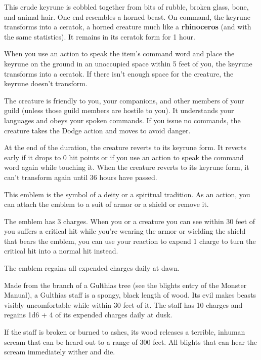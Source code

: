 \documentclass[10pt,a4paper,twoside,bg=print,twocolumn,openany,nodeprecatedcode]{dndbook}
\begin{document}
This crude keyrune is cobbled together from bits of rubble, broken glass, bone, and animal hair. One end resembles a horned beast. On command, the keyrune transforms into a ceratok, a horned creature much like a \textbf{rhinoceros} (and with the same statistics). It remains in its ceratok form for 1 hour.

When you use an action to speak the item's command word and place the keyrune on the ground in an unoccupied space within 5 feet of you, the keyrune transforms into a ceratok. If there isn't enough space for the creature, the keyrune doesn't transform.

The creature is friendly to you, your companions, and other members of your guild (unless those guild members are hostile to you). It understands your languages and obeys your spoken commands. If you issue no commands, the creature takes the Dodge action and moves to avoid danger.

At the end of the duration, the creature reverts to its keyrune form. It reverts early if it drops to 0 hit points or if you use an action to speak the command word again while touching it. When the creature reverts to its keyrune form, it can't transform again until 36 hours have passed.

This emblem is the symbol of a deity or a spiritual tradition. As an action, you can attach the emblem to a suit of armor or a shield or remove it.

The emblem has 3 charges. When you or a creature you can see within 30 feet of you suffers a critical hit while you're wearing the armor or wielding the shield that bears the emblem, you can use your reaction to expend 1 charge to turn the critical hit into a normal hit instead.

The emblem regains all expended charges daily at dawn.

Made from the branch of a Gulthias tree (see the blights entry of the Monster Manual), a Gulthias staff is a spongy, black length of wood. Its evil makes beasts visibly uncomfortable while within 30 feet of it. The staff has 10 charges and regains 1d6 + 4 of its expended charges daily at dusk.

If the staff is broken or burned to ashes, its wood releases a terrible, inhuman scream that can be heard out to a range of 300 feet. All blights that can hear the scream immediately wither and die.
\end{document}
